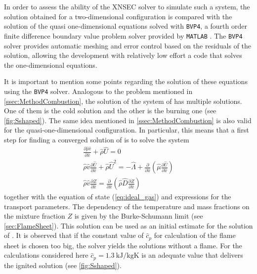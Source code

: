 In order to assess the ability of the XNSEC solver to simulate such a system, the solution obtained for a two-dimensional configuration is compared with the solution of the quasi one-dimensional equations solved with \lstinline|BVP4|, a fourth order finite difference boundary value problem solver provided by \lstinline|MATLAB| \parencite{kierzenkaBVPSolverBased2001}. The \lstinline|BVP4| solver provides automatic meshing and error control based on the residuals of the solution, allowing the development with relatively low effort a code that solves the one-dimensional equations.

It is important to mention some points regarding the solution of these equations using the \lstinline|BVP4| solver. Analogous to the problem mentioned in \cref{ssec:MethodCombustion}, the solution of the system of   has multiple solutions. One of them is the cold solution and the other is the burning one (see \cref{fig:Sshaped}). The same idea mentioned in \cref{ssec:MethodCombustion} is also valid for the quasi-one-dimensional configuration. In particular, this means that a first step for finding a converged solution of  is to solve the system
\begin{subequations}
\begin{gather}
\frac{\partial \hat \rho \hat v}{\partial \hat x} +  \hat \rho \hat U = 0\\ \label{eq:OneDimCont2}%
\hat \rho \hat v \frac{\partial \hat U}{\partial \hat x} + \hat \rho \hat U^2 =
- \hat \Lambda
+ \frac{\partial}{\partial \hat x}\left(\hat \mu \frac{\partial \hat U}{\partial \hat x}\right)\\ \label{eq:OneDimMom2}%
\hat \rho \hat v \frac{\partial Z}{\partial \hat x} = 
\frac{\partial}{\partial \hat x}\left(\hat \rho \hat D \frac{\partial Z}{\partial \hat x}\right)
\end{gather}\label{eqs:OneDimEquationsMixtureFraction}
\end{subequations}
together with the equation of state (\ref{eq:ideal_gas}) and expressions for the transport parameters. The dependency of the temperature and mass fractions on the mixture fraction $Z$ is given by the Burke-Schumann limit (see \cref{sec:FlameSheet}). This solution can be used as an initial estimate for the solution of . It is observed that if the constant value of $\hat c_p$ for calculation of the flame sheet is chosen too big, the solver yields the solutions without a flame. For the calculations considered here $\hat c_p =\SI{1.3}{\kilo \joule\per\kilogram \kelvin}$ is an adequate value that delivers the ignited solution (see \cref{fig:Sshaped}).

